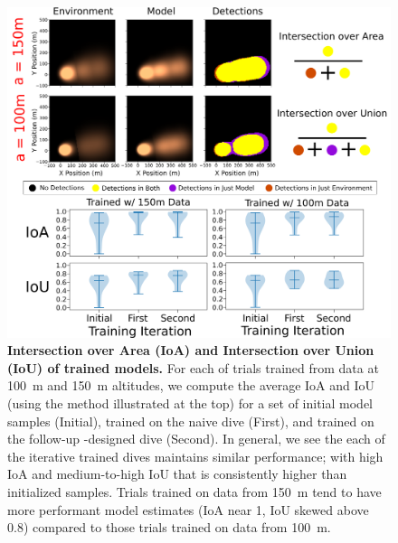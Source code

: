 \begin{figure}[h!]
    \centering
    \includegraphics[width=0.9\columnwidth]{figures/sim_mod_performance.png}
    \caption{\textbf{Intersection over Area (IoA) and Intersection over Union (IoU) of trained models.} For each of trials trained from data at \SI{100}{\meter} and \SI{150}{\meter} altitudes, we compute the average IoA and IoU (using the method illustrated at the top) for a set of initial model samples (Initial), \PHUMES trained on the naive dive (First), and \PHUMES trained on the follow-up \PHORTEX-designed dive (Second). In general, we see the each of the iterative trained dives maintains similar performance; with high IoA and medium-to-high IoU that is consistently higher than initialized samples. Trials trained on data from \SI{150}{\meter} tend to have more performant model estimates (IoA near 1, IoU skewed above 0.8) compared to those trials trained on data from \SI{100}{\meter}.}
    \label{fig:sim_phumes_perform}
\end{figure}

